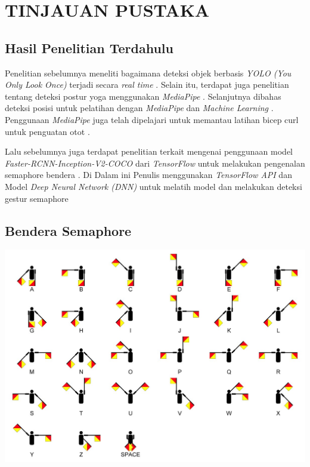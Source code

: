 \chapter{TINJAUAN PUSTAKA}

\section{Hasil Penelitian Terdahulu}
Penelitian sebelumnya meneliti bagaimana deteksi objek berbasis \textit{YOLO (You Only Look Once)} terjadi secara \textit{real time} \cite{redmon2016you}. Selain itu, terdapat juga penelitian tentang deteksi postur yoga menggunakan \textit{MediaPipe} \cite{garg2022yoga}. Selanjutnya dibahas deteksi posisi untuk pelatihan dengan \textit{MediaPipe} dan \textit{Machine Learning} \cite{supanich2023machine}. Penggunaan \textit{MediaPipe} juga telah dipelajari untuk memantau latihan bicep curl untuk penguatan otot \cite{nguyen2023assessing}.

  Lalu sebelumnya juga terdapat penelitian terkait mengenai penggunaan model \textit{Faster-RCNN-Inception-V2-COCO} dari \textit{TensorFlow} untuk melakukan pengenalan semaphore bendera . Di Dalam ini Penulis menggunakan \textit{TensorFlow API} dan Model \textit{Deep Neural Network (DNN)} untuk melatih model dan melakukan deteksi gestur semaphore \cite{motty2023flag}


\section{Bendera Semaphore}

\begin{center}
	\includegraphics[width=1\linewidth]{gambar/bener/Semaphore-Pose.jpg}
	\label{fig:BenderaSemaphore}
\end{center}

